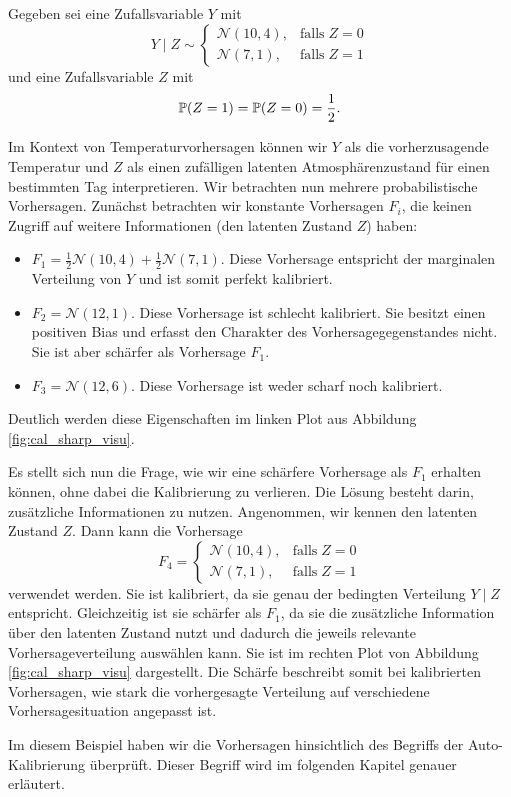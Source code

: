\begin{bsp}\label{bsp:cal_sharp}
Gegeben sei eine Zufallsvariable $Y$ mit
\[
Y \mid Z \sim
\begin{cases}
\mathcal{N}(10,4), & \text{falls}\; Z = 0 \\
\mathcal{N}(7,1), &  \text{falls}\; Z = 1
\end{cases}
\] 
und eine Zufallsvariable $Z$ mit
\[
\mathbb{P}(Z=1)=\mathbb{P}(Z=0)=\frac{1}{2}.
\]

Im Kontext von Temperaturvorhersagen können wir $Y$ als die vorherzusagende Temperatur und $Z$ als einen zufälligen latenten Atmosphärenzustand für einen bestimmten Tag interpretieren. Wir betrachten nun mehrere probabilistische Vorhersagen. Zunächst betrachten wir konstante Vorhersagen $F_i$, die keinen Zugriff auf weitere Informationen (den latenten Zustand $Z$) haben:

\begin{itemize}
    \item $F_1=\frac{1}{2}\mathcal{N}(10,4)+\frac{1}{2}\mathcal{N}(7,1)$. Diese Vorhersage entspricht der marginalen Verteilung von $Y$ und ist somit perfekt kalibriert.
    \item $F_2=\mathcal{N}(12,1)$. Diese Vorhersage ist schlecht kalibriert. Sie besitzt einen positiven Bias und erfasst den Charakter des Vorhersagegegenstandes nicht. Sie ist aber schärfer als Vorhersage $F_1$.
    \item $F_3=\mathcal{N}(12,6)$. Diese Vorhersage ist weder scharf noch kalibriert.
\end{itemize}
Deutlich werden diese Eigenschaften im linken Plot aus Abbildung \ref{fig:cal_sharp_visu}.

Es stellt sich nun die Frage, wie wir eine schärfere Vorhersage als $F_1$ erhalten können, ohne dabei die Kalibrierung zu verlieren. Die Lösung besteht darin, zusätzliche Informationen zu nutzen. Angenommen, wir kennen den latenten Zustand $Z$. Dann kann die Vorhersage
\[
F_4= \begin{cases}
\mathcal{N}(10,4), & \text{falls}\; Z = 0 \\
\mathcal{N}(7,1), &  \text{falls}\; Z = 1
\end{cases}
\]
verwendet werden. Sie ist kalibriert, da sie genau der bedingten Verteilung $Y\mid Z$ entspricht. Gleichzeitig ist sie schärfer als $F_1$, da sie die zusätzliche Information über den latenten Zustand nutzt und dadurch die jeweils relevante Vorhersageverteilung auswählen kann. Sie ist im rechten Plot von Abbildung \ref{fig:cal_sharp_visu} dargestellt. Die Schärfe beschreibt somit bei kalibrierten Vorhersagen, wie stark die vorhergesagte Verteilung auf verschiedene Vorhersagesituation angepasst ist.

Im diesem Beispiel haben wir die Vorhersagen hinsichtlich des Begriffs der Auto-Kalibrierung überprüft. Dieser Begriff wird im folgenden Kapitel genauer erläutert.
\end{bsp}

